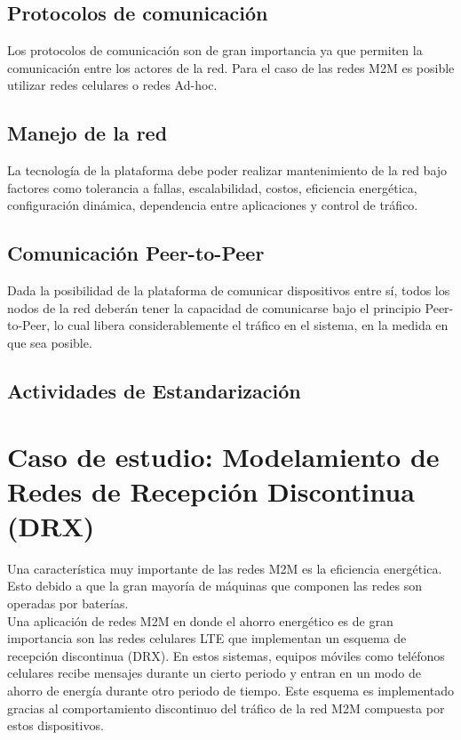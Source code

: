 \documentclass[journal]{IEEEtran}
\begin{document}
\subsection{Protocolos de comunicación}

Los protocolos de comunicación son de gran importancia ya que permiten la comunicación entre los actores de la red. Para el caso de las redes M2M es posible utilizar redes celulares o redes Ad-hoc.

\subsection{Manejo de la red}

La tecnología de la plataforma debe poder realizar mantenimiento de la red bajo factores como tolerancia a fallas, escalabilidad, costos, eficiencia energética, configuración dinámica, dependencia entre aplicaciones y control de tráfico.

\subsection{Comunicación Peer-to-Peer}

Dada la posibilidad de la plataforma de comunicar dispositivos entre sí, todos los nodos de la red deberán tener la capacidad de comunicarse bajo el principio Peer-to-Peer, lo cual libera considerablemente el tráfico en el sistema, en la medida en que sea posible.

\subsection{Actividades de Estandarización}

\section{Caso de estudio: Modelamiento de Redes de Recepción Discontinua (DRX)}

Una característica muy importante de las redes M2M es la eficiencia energética. Esto debido a que la gran mayoría de máquinas que componen las redes son operadas por baterías.\\

Una aplicación de redes M2M en donde el ahorro energético es de gran importancia son las redes celulares LTE que implementan un esquema de recepción discontinua (DRX). En estos sistemas, equipos móviles como teléfonos celulares recibe mensajes durante un cierto periodo y entran en un modo de ahorro de energía durante otro periodo de tiempo. Este esquema es implementado gracias al comportamiento discontinuo del tráfico de la red M2M compuesta por estos dispositivos.\\
\end{document}
